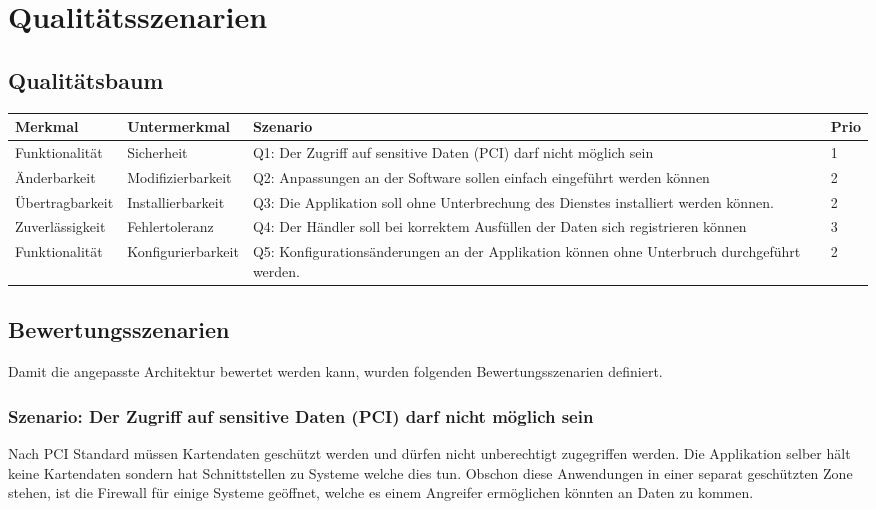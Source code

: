 \chapter{Qualitätsszenarien}
\label{sec:qualityscenarios}

\section{Qualitätsbaum}
\begin{table}[H]
	\centering
	\begin{tabular}{ | p{3cm} | p{3.5cm} | p{6.5cm} | p{1cm} | }
		\toprule
		{\textbf{Merkmal}} & {\textbf{Untermerkmal}} & {\textbf{Szenario}} & {\textbf{Prio}} \\
		\midrule
		Funktionalität & Sicherheit & Q1: Der Zugriff auf sensitive Daten (PCI) darf nicht möglich sein & 1 \\ \hline
		Änderbarkeit & Modifizierbarkeit & Q2: Anpassungen an der Software sollen einfach eingeführt werden können & 2 \\ \hline
		Übertragbarkeit & Installierbarkeit & Q3: Die Applikation soll ohne Unterbrechung des Dienstes installiert werden können. & 2 \\ \hline
		Zuverlässigkeit & Fehlertoleranz & Q4: Der Händler soll bei korrektem Ausfüllen der Daten sich registrieren können & 3 \\ \hline
		Funktionalität & Konfigurierbarkeit & Q5: Konfigurationsänderungen an der Applikation können ohne Unterbruch durchgeführt werden. & 2 \\
		\bottomrule
	\end{tabular}
\end{table}
\newpage
\section{Bewertungsszenarien}

Damit die angepasste Architektur bewertet werden kann, wurden folgenden Bewertungsszenarien definiert. 

\subsection{Szenario: Der Zugriff auf sensitive Daten (PCI) darf nicht möglich sein}
Nach PCI Standard müssen Kartendaten geschützt werden und dürfen nicht unberechtigt zugegriffen werden. Die Applikation selber hält keine Kartendaten sondern hat Schnittstellen zu Systeme welche dies tun. Obschon diese Anwendungen in einer separat geschützten Zone stehen, ist die Firewall für einige Systeme geöffnet, welche es einem Angreifer ermöglichen könnten an Daten zu kommen.

